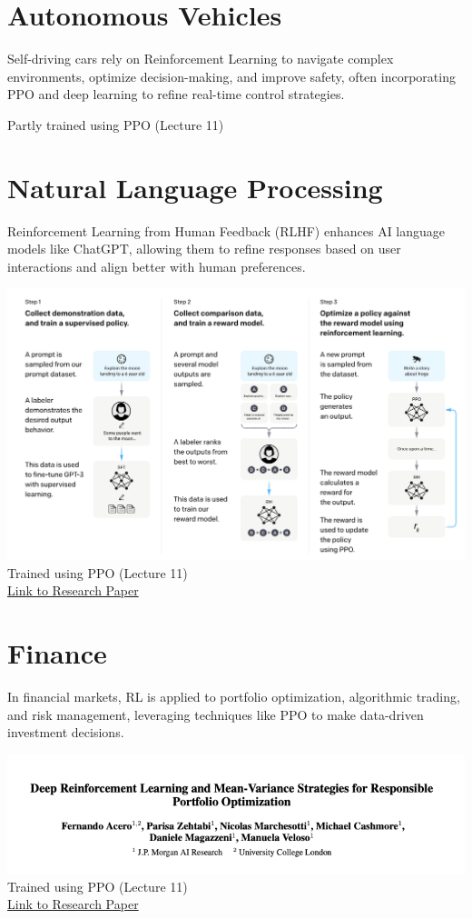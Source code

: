 \documentclass[
  letterpaper,
  DIV=11,
  numbers=noendperiod]{scrreprt}
\begin{document}
\section{Autonomous Vehicles}\label{autonomous-vehicles}

Self-driving cars rely on Reinforcement Learning to navigate complex
environments, optimize decision-making, and improve safety, often
incorporating PPO and deep learning to refine real-time control
strategies.

Partly trained using PPO (Lecture 11)

\section{Natural Language Processing}\label{natural-language-processing}

Reinforcement Learning from Human Feedback (RLHF) enhances AI language
models like ChatGPT, allowing them to refine responses based on user
interactions and align better with human preferences.

\includegraphics[width=0.7\linewidth,height=\textheight,keepaspectratio]{lecture1/images/rlhf.png}\\
Trained using PPO (Lecture 11)\\
\href{https://arxiv.org/pdf/2203.02155}{Link to Research Paper}

\section{Finance}\label{finance}

In financial markets, RL is applied to portfolio optimization,
algorithmic trading, and risk management, leveraging techniques like PPO
to make data-driven investment decisions.

\includegraphics[width=0.7\linewidth,height=\textheight,keepaspectratio]{lecture1/images/jpmorgan.png}\\
Trained using PPO (Lecture 11)\\
\href{https://arxiv.org/pdf/2403.16667}{Link to Research Paper}
\end{document}
